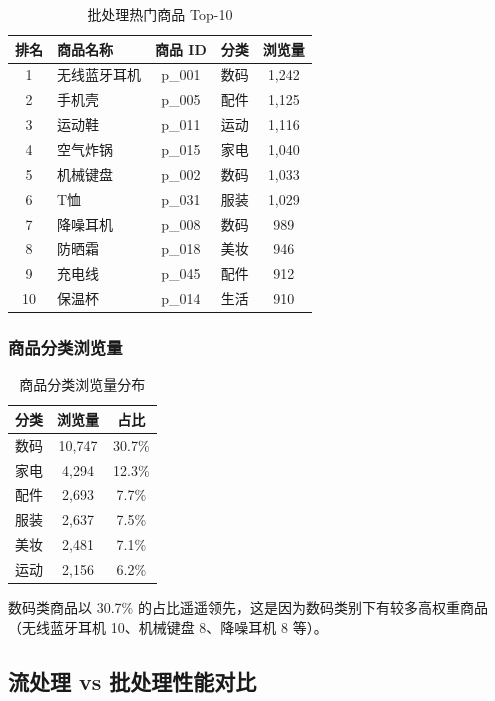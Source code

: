 \documentclass[12pt,a4paper]{article}
\begin{document}
\begin{table}[H]
\centering
\caption{批处理热门商品 Top-10}
\label{tab:batch-products}
\begin{tabular}{clccc}
\toprule
\textbf{排名} & \textbf{商品名称} & \textbf{商品 ID} & \textbf{分类} & \textbf{浏览量} \\
\midrule
1 & 无线蓝牙耳机 & p\_001 & 数码 & 1,242 \\
2 & 手机壳 & p\_005 & 配件 & 1,125 \\
3 & 运动鞋 & p\_011 & 运动 & 1,116 \\
4 & 空气炸锅 & p\_015 & 家电 & 1,040 \\
5 & 机械键盘 & p\_002 & 数码 & 1,033 \\
6 & T恤 & p\_031 & 服装 & 1,029 \\
7 & 降噪耳机 & p\_008 & 数码 & 989 \\
8 & 防晒霜 & p\_018 & 美妆 & 946 \\
9 & 充电线 & p\_045 & 配件 & 912 \\
10 & 保温杯 & p\_014 & 生活 & 910 \\
\bottomrule
\end{tabular}
\end{table}

\subsubsection{商品分类浏览量}

\begin{table}[H]
\centering
\caption{商品分类浏览量分布}
\label{tab:category}
\begin{tabular}{lcc}
\toprule
\textbf{分类} & \textbf{浏览量} & \textbf{占比} \\
\midrule
数码 & 10,747 & 30.7\% \\
家电 & 4,294 & 12.3\% \\
配件 & 2,693 & 7.7\% \\
服装 & 2,637 & 7.5\% \\
美妆 & 2,481 & 7.1\% \\
运动 & 2,156 & 6.2\% \\
\bottomrule
\end{tabular}
\end{table}

数码类商品以 30.7\% 的占比遥遥领先，这是因为数码类别下有较多高权重商品（无线蓝牙耳机 10、机械键盘 8、降噪耳机 8 等）。

\subsection{流处理 vs 批处理性能对比}
\end{document}
